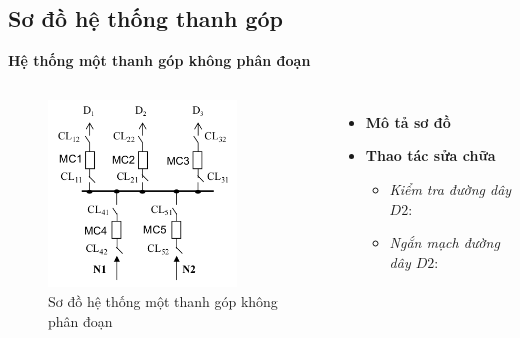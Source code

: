 \documentclass{beamer}
\begin{document}
\subsection{Sơ đồ hệ thống thanh góp}
\begin{frame}{\textbf{Hệ thống một thanh góp không phân đoạn}}
\begin{columns}
\begin{figure}[h]
\includegraphics[width=5cm, height=5cm]{mtgkpd}
\caption{Sơ đồ hệ thống một thanh góp không phân đoạn}
\end{figure}

\begin{itemize}
\item<1-> \textbf{Mô tả sơ đồ}
\item<2-> \textbf{Thao tác sửa chữa}
\begin{itemize}
\item<3-> \emph{Kiểm tra đường dây $D2$}: 
\item<3-> \emph{Ngắn mạch đường dây $D2$}: 
\end{itemize}
\end{itemize}
\end{columns}
\end{frame}
\end{document}
